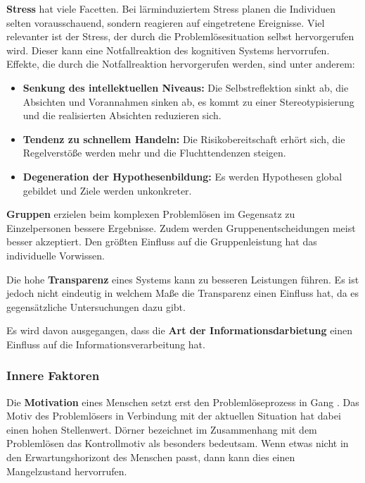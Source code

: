 \textbf{Stress} hat viele Facetten. Bei lärminduziertem Stress planen die Individuen selten vorausschauend, sondern reagieren auf eingetretene Ereignisse. Viel relevanter ist der Stress, der durch die Problemlösesituation selbst hervorgerufen wird. Dieser kann eine Notfallreaktion des kognitiven Systems hervorrufen. Effekte, die durch die Notfallreaktion hervorgerufen werden, sind unter anderem:
\begin{itemize}
\item \textbf{Senkung des intellektuellen Niveaus:} Die Selbstreflektion sinkt ab, die Absichten und Vorannahmen sinken ab, es kommt zu einer Stereotypisierung und die realisierten Absichten reduzieren sich.
\item \textbf{Tendenz zu schnellem Handeln:} Die Risikobereitschaft erhört sich, die Regelverstöße werden mehr und die Fluchttendenzen steigen.
\item \textbf{Degeneration der Hypothesenbildung:} Es werden Hypothesen global gebildet und Ziele werden unkonkreter.
\end{itemize}

\textbf{Gruppen} erzielen beim komplexen Problemlösen im Gegensatz zu Einzelpersonen bessere Ergebnisse. Zudem werden Gruppenentscheidungen meist besser akzeptiert. Den größten Einfluss auf die Gruppenleistung hat das individuelle Vorwissen.

Die hohe \textbf{Transparenz} eines Systems kann zu besseren Leistungen führen. Es ist jedoch nicht eindeutig in welchem Maße die Transparenz einen Einfluss hat, da es gegensätzliche Untersuchungen dazu gibt.

Es wird davon ausgegangen, dass die \textbf{Art der Informationsdarbietung} einen Einfluss auf die Informationsverarbeitung hat.

\subsubsection*{Innere Faktoren}
Die \textbf{Motivation} eines Menschen setzt erst den Problemlöseprozess in Gang \cite{Dorner1984}. Das Motiv des Problemlösers in Verbindung mit der aktuellen Situation hat dabei einen hohen Stellenwert. Dörner \cite{Dorner1984} bezeichnet im Zusammenhang mit dem Problemlösen das Kontrollmotiv als besonders bedeutsam. Wenn etwas nicht in den Erwartungshorizont des Menschen passt, dann kann dies einen Mangelzustand hervorrufen.

